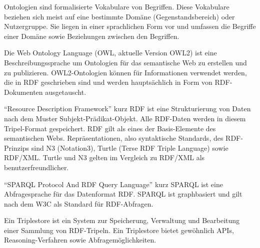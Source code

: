 {Ontologien sind formalisierte Vokabulare von Begriffen. Diese Vokabulare beziehen sich meist auf eine bestimmte Domäne (Gegenstandsbereich) oder Nutzergruppe. Sie liegen in einer sprachlichen Form vor und umfassen die Begriffe einer Domäne sowie Beziehungen zwischen den Begriffen. \cite{owl,ontologie-wiki,fraunhofer}
}

{Die Web Ontology Language (OWL, aktuelle Version OWL2) ist eine Beschreibungssprache um Ontologien für das semantische Web zu erstellen und zu publizieren. OWL2-Ontologien können für Informationen verwendet werden, die in RDF geschrieben sind und werden hauptsächlich in Form von RDF-Dokumenten ausgetauscht.
\cite{owl}
}

{“Resource Description Framework” kurz RDF ist eine Strukturierung von Daten nach
dem Muster Subjekt-Prädikat-Objekt. Alle RDF-Daten werden in diesem Tripel-Format 
gespeichert. RDF gilt als eines der Basis-Elemente des semantischen Webs.
Repräsentationen, also syntaktische Standards, des RDF-Prinzips sind N3 (Notation3), 
Turtle (Terse RDF Triple Language) sowie RDF/XML. Turtle und N3 gelten im Vergleich zu RDF/XML als benutzerfreundlicher. \cite{rdf-primer,rdf-wiki,rdf-xml-wiki}}




{“SPARQL Protocol And RDF Query Language” kurz SPARQL ist eine Abfragesprache für das Datenformat RDF. SPARQL ist graphbasiert und gilt nach dem W3C als Standard für RDF-Abfragen. \cite{w3c-rdf-sparql-query,sparql-wiki}}

{Ein Triplestore ist ein System zur Speicherung, Verwaltung und Bearbeitung einer
 Sammlung von RDF-Tripeln. Ein Triplestore bietet gewöhnlich APIs,
 Rea\-so\-ning-Verfahren sowie Abfragemöglichkeiten. \cite{fraunhofer}}


